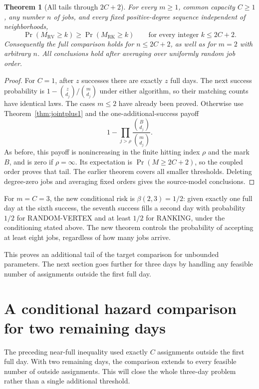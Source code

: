 \documentclass[11pt]{article}
\newtheorem{theorem}{Theorem}
\newcommand{\RV}{\mathrm{RV}}
\newcommand{\RK}{\mathrm{RK}}
\begin{document}
\begin{theorem}[All tails through $2C+2$]\label{thm:2Cplus2}
For every $m\geq1$, common capacity $C\geq1$, any number $n$ of jobs,
and every fixed positive-degree sequence independent of neighborhoods,
\[
 \Pr(M_\RV\geq k)\geq\Pr(M_\RK\geq k)
 \qquad\text{for every integer }k\leq2C+2.
\]
Consequently the full comparison holds for $n\leq2C+2$, as well as
for $m=2$ with arbitrary $n$. All conclusions hold after averaging
over uniformly random job order.
\end{theorem}
\begin{proof}
For $C=1$, after $z$ successes there are exactly $z$ full days.
The next success probability is $1-\binom z{d_j}/\binom m{d_j}$
under either algorithm, so their matching counts have identical laws.
The cases $m\leq2$ have already been proved. Otherwise use
Theorem~\ref{thm:jointplus1} and the one-additional-success payoff
\[
 1-\prod_{j>\rho}\frac{\binom B{d_j}}{\binom m{d_j}}.
\]
As before, this payoff is nonincreasing in the finite hitting index
$\rho$ and the mark $B$, and is zero if $\rho=\infty$.
Its expectation is $\Pr(M\geq2C+2)$, so the coupled order proves
that tail. The earlier theorem covers all smaller thresholds.
Deleting degree-zero jobs and averaging fixed orders gives the
source-model conclusions.
\end{proof}

For $m=C=3$, the new conditional risk is $\beta(2,3)=1/2$:
given exactly one full day at the sixth success, the seventh success
fills a second day with probability $1/2$ for RANDOM-VERTEX and
at least $1/2$ for RANKING, under the conditioning stated above.
The new theorem controls the probability of accepting at least eight
jobs, regardless of how many jobs arrive.

This proves an additional tail of the target comparison for unbounded
parameters. The next section goes further for three days by handling
any feasible number of assignments outside the first full day.

\section{A conditional hazard comparison for two remaining days}
The preceding near-full inequality used exactly $C$ assignments outside
the first full day. With two remaining days, the comparison extends to
every feasible number of outside assignments. This will close the whole
three-day problem rather than a single additional threshold.
\end{document}
